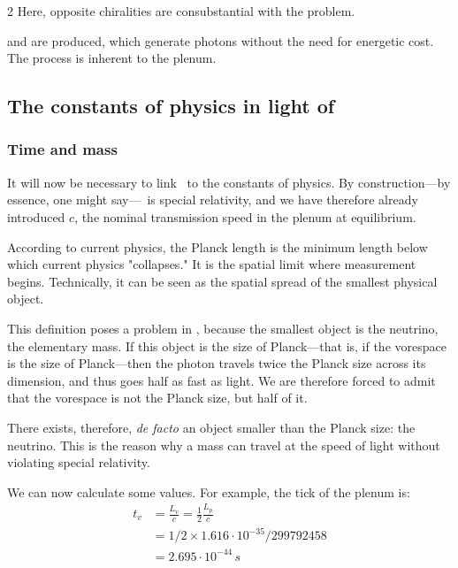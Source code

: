 \begin{multicols}{2}
	Here, opposite chiralities are consubstantial with the problem.
	
	 and  are produced, which generate photons without the need for energetic cost. The process is inherent to the plenum.
	
	\subsection{The constants of physics in light of \PQ}
	
	\subsubsection{Time and mass}
	
	It will now be necessary to link \PQ\ to the constants of physics. By construction—by essence, one might say—\PQ\ is special relativity, and we have therefore already introduced $c$, the nominal transmission speed in the plenum at equilibrium.
	
	According to current physics, the Planck length is the minimum length below which current physics "collapses." It is the spatial limit where measurement begins. Technically, it can be seen as the spatial spread of the smallest physical object.
	
	This definition poses a problem in \PQ, because the smallest object is the neutrino, the elementary mass. If this object is the size of Planck—that is, if the vorespace is the size of Planck—then the photon travels twice the Planck size across its dimension, and thus goes half as fast as light. We are therefore forced to admit that the vorespace is not the Planck size, but half of it.
	
	There exists, therefore, \textit{de facto} an object smaller than the Planck size: the neutrino. This is the reason why a mass can travel at the speed of light without violating special relativity.
	\medskip
	
	We can now calculate some values. For example, the tick of the plenum is:
	\begin{equation*}
		\begin{split}
			t_v &= \frac {L_v}{c} = \frac{1}{2} \frac{L_p}{c} \\
			&= 1/2 \times 1.616 \cdot 10^{-35} /299 792 458 \\
			&= 2.695 \cdot 10^{-44}\,s
		\end{split}
	\end{equation*}
	

\end{multicols}
